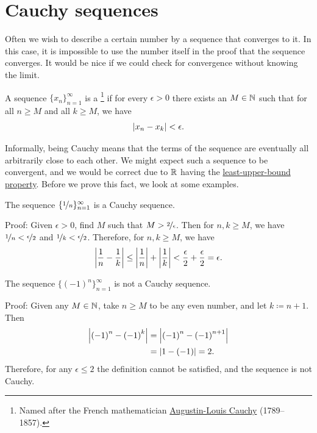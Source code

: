 \sectionnewpage
\section{Cauchy sequences}
\label{sec:cauchy}


Often we wish to describe a certain number 
by a sequence that converges to it.  In this case, it is impossible to use the
number itself in the proof that the sequence converges.
It would be nice if we could check for convergence without knowing
the limit.

\begin{defn}
A sequence $\{ x_n \}_{n=1}^\infty$ is a \emph{}%
\footnote{%
Named after the French mathematician
\href{https://en.wikipedia.org/wiki/Cauchy}{Augustin-Louis Cauchy} (1789--1857).} if
for every $\epsilon > 0$ there exists an $M \in {\mathbb{N}}$ such that
for all $n \geq M$ and all $k \geq M$, we have
\begin{equation*}
\left\lvert {x_n - x_k} \right\rvert < \epsilon .
\end{equation*}
\end{defn}

Informally, being Cauchy means that the terms of the sequence are eventually
all arbitrarily close to each other.  We might expect such a sequence to be
convergent, and we would be correct due to ${\mathbb{R}}$ having the
\hyperref[defn:lub]{least-upper-bound property}.  Before we prove this fact,
we look at some examples.

\begin{example}
The sequence $\{ \nicefrac{1}{n} \}_{n=1}^\infty$ is a Cauchy sequence.

Proof:  Given $\epsilon > 0$, find $M$ such that
$M > \nicefrac{2}{\epsilon}$.  Then for $n,k \geq M$,
we have $\nicefrac{1}{n} < \nicefrac{\epsilon}{2}$
and
$\nicefrac{1}{k} < \nicefrac{\epsilon}{2}$.  Therefore, for $n, k \geq M$,
we have
\begin{equation*}
\left\lvert {\frac{1}{n} - \frac{1}{k}} \right\rvert
\leq
\left\lvert {\frac{1}{n}} \right\rvert + \left\lvert {\frac{1}{k}} \right\rvert
< \frac{\epsilon}{2} + \frac{\epsilon}{2} = \epsilon.
\end{equation*}
\end{example}

\begin{example}
The sequence $\bigl\{ {(-1)}^n \bigr\}_{n=1}^\infty$ is not a Cauchy sequence.

Proof:
Given any $M \in {\mathbb{N}}$, take $n \geq M$ to be any even number, and
let $k \coloneqq n+1$.  Then
\begin{equation*}
\begin{split}
\left\lvert {{(-1)}^n - {(-1)}^k} \right\rvert
& =
\left\lvert {{(-1)}^n - {(-1)}^{n+1}} \right\rvert
\\
& =
\left\lvert {1 - (-1)} \right\rvert = 2 .
\end{split}
\end{equation*}
Therefore, for any $\epsilon \leq 2$ the definition cannot be satisfied, and
the sequence is not Cauchy.
\end{example}

